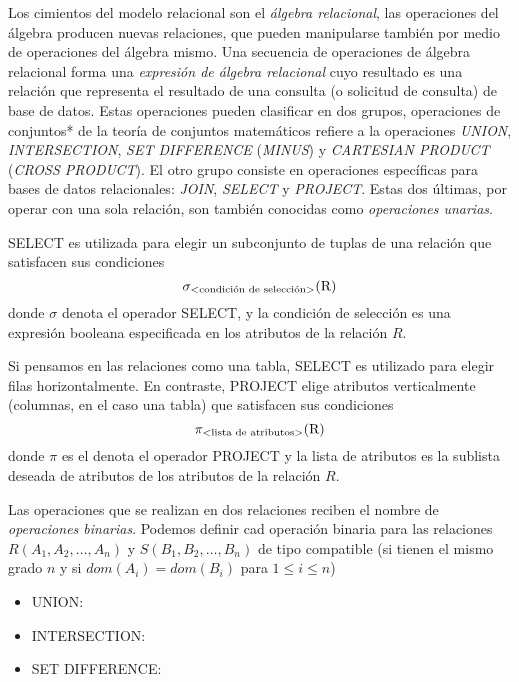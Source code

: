 Los cimientos del modelo relacional son el \emph{álgebra relacional}, las operaciones del álgebra producen nuevas relaciones, que pueden manipularse también por medio de operaciones del álgebra mismo. Una secuencia de operaciones de álgebra relacional forma una \emph{expresión de álgebra relacional} cuyo resultado es una relación que representa el resultado de una consulta (o solicitud de consulta) de base de datos. Estas operaciones pueden clasificar en dos grupos, operaciones de conjuntos* de la teoría de conjuntos matemáticos refiere a la operaciones \emph{UNION}, \emph{INTERSECTION}, \emph{SET DIFFERENCE} (\emph{MINUS}) y \emph{CARTESIAN PRODUCT} (\emph{CROSS PRODUCT}). El otro grupo consiste en operaciones específicas para bases de datos relacionales: \emph{JOIN}, \emph{SELECT} y \emph{PROJECT}. Estas dos últimas, por operar con una sola relación, son también conocidas como \emph{operaciones unarias}.

SELECT es utilizada para elegir un subconjunto de tuplas de una relación que satisfacen sus condiciones
\begin{equation}
\sigma_\text{\textless condición de selección\textgreater}{\text{(R)}}
\end{equation}
donde $\sigma$ denota el operador SELECT, y la condición de selección es una expresión booleana especificada en los atributos de la relación $R$.

Si pensamos en las relaciones como una tabla, SELECT es utilizado para elegir filas horizontalmente. En contraste, PROJECT elige atributos verticalmente (columnas, en el caso una tabla) que satisfacen sus condiciones
\begin{equation}
\pi_\text{\textless lista de atributos\textgreater}{\text{(R)}}
\end{equation}
donde $\pi$ es el denota el operador PROJECT y la lista de atributos es la sublista deseada de atributos de los atributos de la relación $R$.

Las operaciones que se realizan en dos relaciones reciben el nombre de \emph{operaciones binarias}. Podemos definir cad operación binaria para las relaciones $R(A_1,A_2,\ldots,A_n)$ y $S(B_1,B_2,\ldots,B_n)$ de tipo compatible (si tienen el mismo grado $n$ y si $dom(A_i)=dom(B_i)$ para $1\leq i\leq n$)
\begin{itemize}
\item UNION:
\item INTERSECTION:
\item SET DIFFERENCE:
\end{itemize}